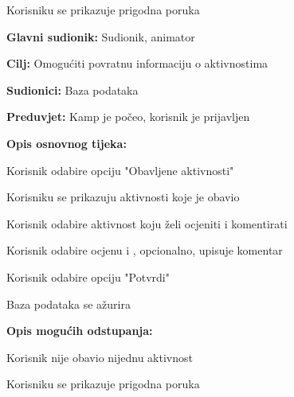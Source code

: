 \begin{packed_item}
\begin{packed_item}
\begin{packed_item}
\begin{packed_enum}
								\item Korisniku se prikazuje prigodna poruka
							\end{packed_enum}
						\end{packed_item}
					\end{packed_item}
					
					\noindent {}
					\begin{packed_item}
						
						\item \textbf{Glavni sudionik: }Sudionik, animator
						\item  \textbf{Cilj:} Omogućiti povratnu informaciju o aktivnostima
						\item  \textbf{Sudionici:} Baza podataka
						\item  \textbf{Preduvjet:} Kamp je počeo, korisnik je prijavljen
						\item  \textbf{Opis osnovnog tijeka:}
						
						\item[] \begin{packed_enum}
							
							\item Korisnik odabire opciju "Obavljene aktivnosti"
							\item Korisniku se prikazuju aktivnosti koje je obavio
							\item Korisnik odabire aktivnost koju želi ocjeniti i komentirati
							\item Korisnik odabire ocjenu i , opcionalno, upisuje komentar
							\item Korisnik odabire opciju "Potvrdi"
							\item Baza podataka se ažurira
						\end{packed_enum}
						
						\item  \textbf{Opis mogućih odstupanja:}
						
						\item[] \begin{packed_item}
							
							\item[2.a] Korisnik nije obavio nijednu aktivnost
							\item[] \begin{packed_enum}
								
								\item Korisniku se prikazuje prigodna poruka
								

\end{packed_enum}
\end{packed_item}
\end{packed_item}
\end{packed_item}
